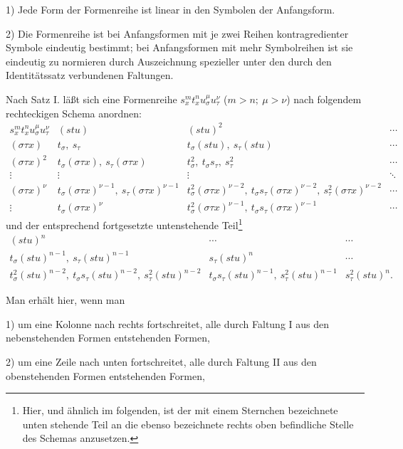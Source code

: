 \documentclass[11pt]{article}
\begin{document}
1) Jede Form der Formenreihe ist linear in den Symbolen der Anfangsform.

2) Die Formenreihe ist bei Anfangsformen mit je zwei Reihen kontragredienter Symbole eindeutig bestimmt; bei Anfangsformen mit mehr Symbolreihen ist sie eindeutig zu normieren durch Auszeichnung spezieller unter den durch den Identitätssatz verbundenen Faltungen.

Nach Satz I. läßt sich eine Formenreihe $s_x^m t_x^n u_\sigma^\mu u_\tau^\nu$ ($m>n;\ \mu>\nu$) nach folgendem rechteckigen Schema anordnen:
\begingroup\small
\[
\begin{array}{c|c|c|c}
s_x^m t_x^n u_\sigma^\mu u_\tau^\nu
& (stu)
& (stu)^2
& \cdots\\[0.3em]
(\sigma\tau x)
& t_\sigma,\ s_\tau
& t_\sigma(stu),\ s_\tau(stu)
& \cdots\\[0.3em]
(\sigma\tau x)^2
& t_\sigma(\sigma\tau x),\ s_\tau(\sigma\tau x)
& t_\sigma^2,\ t_\sigma s_\tau,\ s_\tau^2
& \cdots\\[0.3em]
\vdots&\vdots&\vdots&\ddots\\[0.3em]
(\sigma\tau x)^\nu
& t_\sigma(\sigma\tau x)^{\nu-1},\ s_\tau(\sigma\tau x)^{\nu-1}
& t_\sigma^2(\sigma\tau x)^{\nu-2},\ t_\sigma s_\tau(\sigma\tau x)^{\nu-2},\ s_\tau^2(\sigma\tau x)^{\nu-2}
& \cdots\\[0.3em]
\vdots
& t_\sigma(\sigma\tau x)^\nu
& t_\sigma^2(\sigma\tau x)^{\nu-1},\ t_\sigma s_\tau(\sigma\tau x)^{\nu-1}
& \cdots
\end{array}
\]
\endgroup
und der entsprechend fortgesetzte untenstehende Teil\footnote{Hier, und ähnlich im folgenden, ist der mit einem Sternchen bezeichnete unten stehende Teil an die ebenso bezeichnete rechts oben befindliche Stelle des Schemas anzusetzen.}
\begingroup\small
\[
\begin{array}{c|c|c}
(stu)^n & \cdots & \cdots\\[0.3em]
t_\sigma(stu)^{n-1},\ s_\tau(stu)^{n-1}
& s_\tau(stu)^n & \cdots\\[0.3em]
t_\sigma^2(stu)^{n-2},\ t_\sigma s_\tau(stu)^{n-2},\ s_\tau^2(stu)^{n-2}
& t_\sigma s_\tau(stu)^{n-1},\ s_\tau^2(stu)^{n-1}
& s_\tau^2(stu)^n .
\end{array}
\]
\endgroup

Man erhält hier, wenn man

1) um eine Kolonne nach rechts fortschreitet, alle durch Faltung I aus den nebenstehenden Formen entstehenden Formen,

2) um eine Zeile nach unten fortschreitet, alle durch Faltung II aus den obenstehenden Formen entstehenden Formen,
\end{document}

